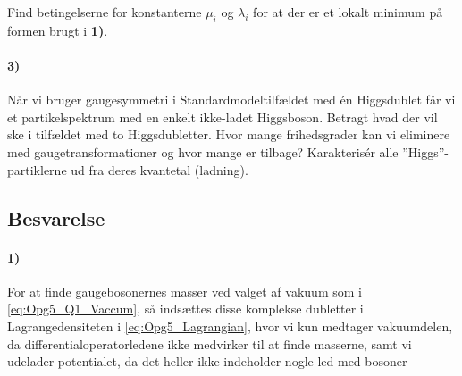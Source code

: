 \documentclass[../main.tex]{subfiles}
\begin{document}
Find betingelserne for konstanterne $\mu_i$ og $\lambda_i$ for at der er et lokalt minimum på formen brugt i \textbf{1)}.



\paragraph*{\textbf{3)}}

Når vi bruger gaugesymmetri i Standardmodeltilfældet med én Higgsdublet får vi et partikelspektrum med en enkelt ikke-ladet Higgsboson. Betragt hvad der vil ske i tilfældet med to Higgsdubletter. Hvor mange frihedsgrader kan vi eliminere med gaugetransformationer og hvor mange er tilbage? Karakterisér alle ''Higgs''-partiklerne ud fra deres kvantetal (ladning).



\subsection{Besvarelse}


\paragraph[1) Gaugebosoners masse ved valg af vakuumtilstande]{\textbf{1)}}

For at finde gaugebosonernes masser ved valget af vakuum som i \cref{eq:Opg5_Q1_Vaccum}, så indsættes disse komplekse dubletter i Lagrangedensiteten i \cref{eq:Opg5_Lagrangian}, hvor vi kun medtager vakuumdelen, da differentialoperatorledene ikke medvirker til at finde masserne, samt vi udelader potentialet, da det heller ikke indeholder nogle led med bosoner


\end{document}
